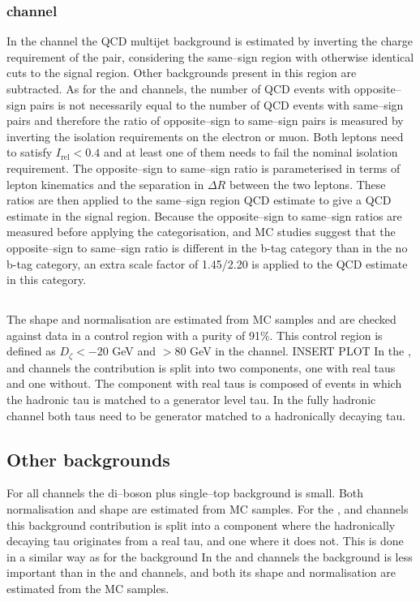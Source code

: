 \subsubsection{\texorpdfstring{\emu channel}{e mu channel}}
\label{sec:mssm_bkgs_qcd_em}
In the \emu channel the QCD multijet background
is estimated by inverting the charge requirement
of the pair, considering the same--sign region
with otherwise identical cuts to the signal region.
Other backgrounds present in this region are subtracted.
As for the \etau and \mutau channels, the number of
QCD events with opposite--sign \emu pairs is not
necessarily equal to the number of QCD events
with same--sign \emu pairs and therefore the ratio
of opposite--sign to same--sign pairs is measured by inverting
the isolation requirements on the electron or muon. Both
leptons need to satisfy $I_{\text{rel}} < 0.4$ and at 
least one of them needs to fail the nominal isolation requirement.
The opposite--sign to same--sign ratio is parameterised in terms
of lepton kinematics and the separation in $\Delta R$ between the
two leptons. These ratios are then applied to the same--sign region
QCD estimate to give a QCD estimate in the signal region. 
Because the opposite--sign to same--sign ratios are measured
before applying the categorisation, and \ac{MC} studies suggest
that the opposite--sign to same--sign ratio is different in the b-tag
category than in the no b-tag category, an extra scale factor of 
1.45/2.20 is applied to the QCD estimate in this category.


\subsection{\texorpdfstring{\ttbar}{ttbar}}
\label{sec:mssm_bkgs_tt}
The \ttbar shape and normalisation are estimated from \ac{MC} 
samples and are checked against data in a control
region with a \ttbar purity of 91\%. This control region
is defined as $D_{\zeta} < -20$ GeV and \MET $>80$ GeV in 
the \emu channel. INSERT PLOT
In the \mutau, \etau and \tautau channels
the \ttbar contribution is split into
two components, one with real taus and 
one without. The component with real taus is composed
of \ttbar events in which the hadronic tau is matched
to a generator level tau. In the fully hadronic channel
both taus need to be generator matched to a hadronically
decaying tau.

\subsection{Other backgrounds}
\label{sec:mssm_bkgs_other}
For all channels the di--boson plus 
single--top background is small.
Both normalisation and shape are estimated from \ac{MC}
samples. For the \etau, \mutau and \tautau channels
this background contribution is split into a component
where the hadronically decaying tau originates from a real
tau, and one where it does not. This is done in a similar
way as for the \ttbar background
In the \tautau and \emu channels the \Wjets background
is less important than in the \etau and \mutau channels, and both
its shape and normalisation are estimated from the
\ac{MC} samples.


